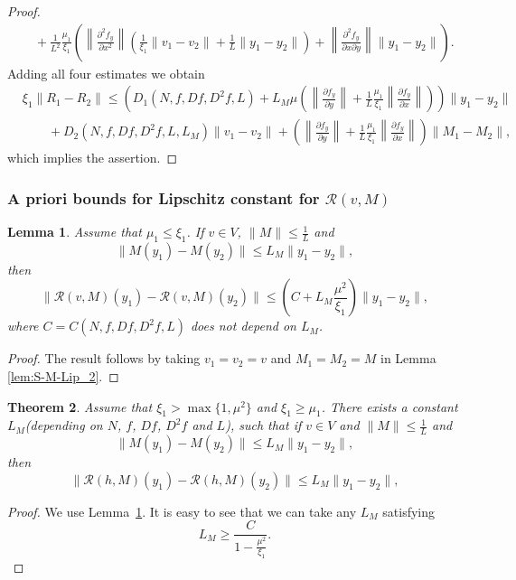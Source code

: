 \documentclass[11pt, leqno]{amsart}
\newtheorem{thm}{Theorem}[section]
\newtheorem{lem}[thm]{Lemma}
\theoremstyle{definition}
\begin{document}
\begin{proof}
\begin{align*}
	 & \ \ \ + \frac{1}{L^2} \frac{\mu_1}{\xi_1}\left(\left\|\frac{\partial^2 f_y}{\partial x^2}\right\| \left(\frac{1}{\xi_1}\|v_1-v_2\| + \frac{1}{L}\|y_1-y_2\|\right) + \left\|\frac{\partial^2 f_y}{\partial x \partial y}\right\| \|y_1-y_2\| \right).	
	\end{align*}
Adding all four estimates we obtain
\begin{align*}
& \xi_1 \|R_1-R_2\| \leq \left(D_1(N,f,Df,D^2f,L) + L_M \mu \left(\left\|\frac{\partial f_y}{\partial y}\right\|+\frac{1}{L}\frac{\mu_1}{\xi_1}\left\|\frac{\partial f_y}{\partial x}\right\|\right)\right)\|y_1-y_2\| \\
& \qquad + D_2(N,f,Df,D^2f,L,L_M)\|v_1-v_2\| + \left(\left\|\frac{\partial f_y}{\partial y}\right\|+\frac{1}{L}\frac{\mu_1}{\xi_1}\left\|\frac{\partial f_y}{\partial x}\right\|\right) \|M_1-M_2\|,
\end{align*}
which implies the assertion. 	\end{proof}


\subsubsection{A priori bounds for Lipschitz constant for $\mathcal{R}(v,M)$}


\begin{lem}
\label{lem:S-M-Lip}
Assume that $\mu_1\leq \xi_1$.  If $v \in V$, $\|M\| \leq \frac{1}{L}$ and
\begin{equation}
  \|M(y_1) - M(y_2)\| \leq L_M \|y_1 - y_2\|,
\end{equation}
then
\begin{equation}
  \| \mathcal{R}(v,M)(y_1) - \mathcal{R}(v,M)(y_2)\|  \leq \left( C + L_M \frac{\mu^2}{\xi_1} \right) \|y_1 - y_2\|,
\end{equation}
where  $C=C(N, f,Df,D^2f,L)$ does not depend on $L_M$.
\end{lem}
\begin{proof} The result follows by taking $v_1=v_2=v$ and $M_1=M_2=M$ in Lemma \ref{lem:S-M-Lip_2}.
\end{proof}

\begin{thm}
\label{thm:S2-lip-forM}
Assume that $\xi_1 > \max\{ 1, \mu^2\}$ and $\xi_1\geq \mu_1$. There exists a constant $L_M$(depending on $N$, $f$, $Df$, $D^2f$ and $L$), such that  if $v \in V$  and $\|M\| \leq \frac{1}{L} $ and
   \begin{equation}
  \|M(y_1) - M(y_2)\| \leq L_M \|y_1-y_2\|,  \label{eq:S-Lip-M}
\end{equation}
then
\begin{equation}
  \|\mathcal{R}(h,M)(y_1) - \mathcal{R}(h,M)(y_2)\| \leq L_M \|y_1-y_2\|,  \label{eq:S-Lip-preserved}
\end{equation}
\end{thm}
\begin{proof}
We use Lemma~\ref{lem:S-M-Lip}.  It is easy to see that we can take any $L_M$ satisfying
\begin{equation*}
  L_M \geq \frac{C}{1 - \frac{\mu^2}{\xi_1}}.
\end{equation*}
\end{proof}
\end{document}
